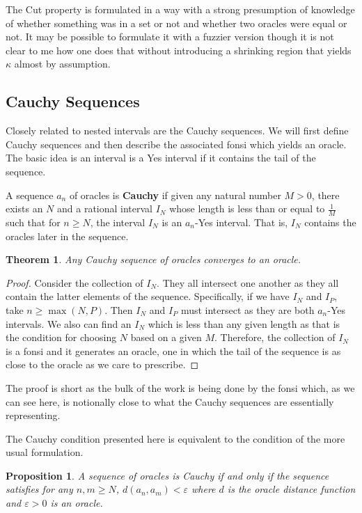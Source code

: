 \documentclass[12pt]{article}
\newtheorem{theorem}{Theorem}[subsection]
\newtheorem{proposition}{Proposition}[subsection]
\begin{document}
The Cut property is formulated in a way with a strong presumption of knowledge of whether something was in a set or not and whether two oracles were equal or not. It may be possible to formulate it with a fuzzier version though it is not clear to me how one does that without introducing a shrinking region that yields $\kappa$ almost by assumption. 


\subsection{Cauchy Sequences}\label{sec:cauchy}

Closely related to nested intervals are the Cauchy sequences. We will first define Cauchy sequences and then describe the associated fonsi which yields an oracle. The basic idea is an interval is a Yes interval if it contains the tail of the sequence. 

A sequence $a_n$ of oracles is \textbf{Cauchy} if given any natural number $M > 0$, there exists an $N$ and a rational interval $I_N$ whose length is less than or equal to $\frac{1}{M}$ such that for $n \geq N$, the interval $I_N$ is an $a_n$-Yes interval. That is, $I_N$ contains the oracles later in the sequence. 

\begin{theorem}\label{th:cauchy}
Any Cauchy sequence of oracles converges to an oracle. 
\end{theorem}

\begin{proof}
    Consider the collection of $I_N$. They all intersect one another as they all contain the latter elements of the sequence. Specifically, if we have $I_N$ and $I_P$, take $n \geq \max(N, P)$. Then $I_N$ and $I_P$ must intersect as they are both $a_n$-Yes intervals. We also can find an $I_N$ which is less than any given length as that is the condition for choosing $N$ based on a given $M$. Therefore, the collection of $I_N$ is a fonsi and it generates an oracle, one in which the tail of the sequence is as close to the oracle as we care to prescribe.     
\end{proof}

The proof is short as the bulk of the work is being done by the fonsi which, as we can see here, is notionally close to what the Cauchy sequences are essentially representing. 

The Cauchy condition presented here is equivalent to the condition of the more usual formulation.

\begin{proposition}
    A sequence of oracles is Cauchy if and only if the sequence satisfies for any $n, m \geq N$, $d(a_n,  a_m) < \varepsilon$ where $d$ is the oracle distance function and $\varepsilon > 0$ is an oracle. 
\end{proposition} 
\end{document}

